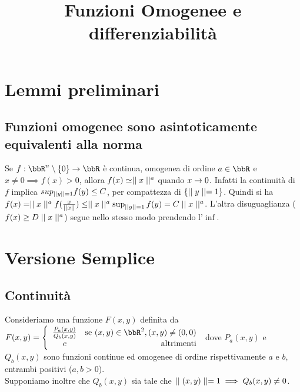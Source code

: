 \documentclass[a4paper,NoNotes,GeneralMath]{stdmdoc}
\begin{document}
	\title {Funzioni Omogenee e differenziabilità}
	
	\section{Lemmi preliminari}
	\subsection{Funzioni omogenee sono asintoticamente equivalenti alla norma}
	Se $f: \bbR^n \setminus \{0\} \rar \bbR$ è continua, omogenea di ordine $a \in \bbR$ e $x \neq 0 \implies f(x) > 0$, allora $f(x) \simeq \mid\mid x \mid\mid^a$ quando $x \rightarrow 0$.
	Infatti la continuità di $f$ implica $sup_{\mid\mid y \mid\mid = 1} f(y) \le C$, per compattezza di $\{\mid\mid y \mid\mid = 1 \}$. Quindi si ha $f(x) = \mid\mid x \mid\mid^a f(\frac{x}{\mid\mid x \mid\mid}) \le \mid\mid x \mid\mid^a \sup_{\mid\mid y \mid\mid = 1} f(y) = C \mid\mid x \mid\mid^a$.
	L'altra disuguaglianza ($f(x) \ge D \mid\mid x \mid\mid^a$) segue nello stesso modo prendendo l'$\inf$.
	
	\section{Versione Semplice}
	\subsection{Continuità}
	Consideriamo una funzione $F(x,y)$ definita da $F(x,y) = \left\{ \begin{array}{cr} \frac{P_a(x,y)}{Q_b(x,y)} & \text{se } (x,y)\in \bbR^2, (x,y) \neq (0,0) \\ c & \text{altrimenti} \\ \end{array} \right.$
		dove $P_a(x,y)$ e $Q_b(x,y)$ sono funzioni continue ed omogenee di ordine rispettivamente $a$ e $b$, entrambi positivi ($a,b>0$). \\
	Supponiamo inoltre che $Q_b(x,y)$ sia tale che $\mid\mid (x,y) \mid\mid = 1 \implies Q_b(x,y) \neq 0$.
	
\end{document}
